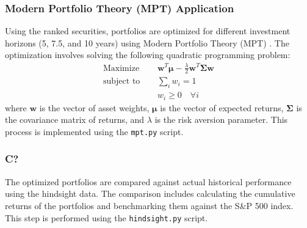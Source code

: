 \subsubsection{Modern Portfolio Theory (MPT) Application}
Using the ranked securities, portfolios are optimized for different investment horizons (5, 7.5, and 10 years) using Modern Portfolio Theory (MPT) \citep{markowitz1952portfolio}. The optimization involves solving the following quadratic programming problem:
\begin{align}
    \text{Maximize } & \quad \mathbf{w}^T \mathbf{\mu} - \frac{\lambda}{2} \mathbf{w}^T \mathbf{\Sigma} \mathbf{w} \\
    \text{subject to} & \quad \sum_{i} w_i = 1 \\
    & \quad w_i \geq 0 \quad \forall i
\end{align}
where \(\mathbf{w}\) is the vector of asset weights, \(\mathbf{\mu}\) is the vector of expected returns, \(\mathbf{\Sigma}\) is the covariance matrix of returns, and \(\lambda\) is the risk aversion parameter. This process is implemented using the \texttt{mpt.py} script.

\subsubsection{C?}
The optimized portfolios are compared against actual historical performance using the hindsight data. The comparison includes calculating the cumulative returns of the portfolios and benchmarking them against the S\&P 500 index. This step is performed using the \texttt{hindsight.py} script.

